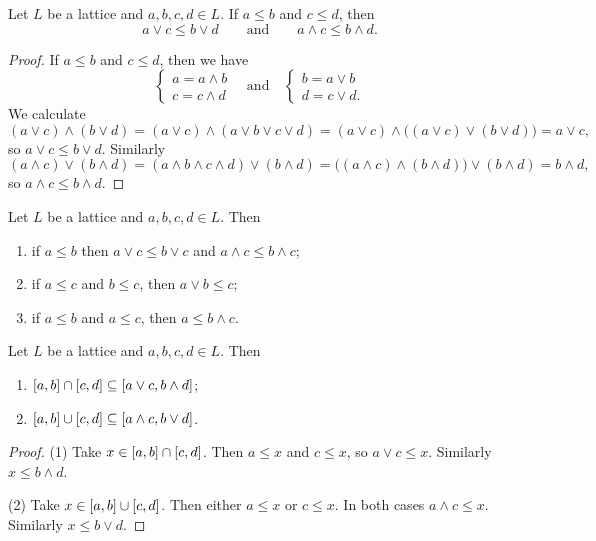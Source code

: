 \begin{lemma} \label{orderLatticeLemma}
Let $L$ be a lattice and $a,b,c,d\in L$. If $a\leq b$ and $c\leq d$, then
\[ a\vee c\leq b\vee d \qquad\text{and}\qquad a\wedge c \leq b\wedge d. \]
\end{lemma}
\begin{proof}
If $a\leq b$ and $c\leq d$, then we have
\[ \begin{cases}
a = a\wedge b \\ c = c\wedge d
\end{cases} \quad \text{and} \quad \begin{cases}
b = a\vee b \\ d = c\vee d.
\end{cases}\]
We calculate
\[ (a\vee c)\wedge (b\vee d) = (a\vee c)\wedge (a\vee b\vee c\vee d) = (a\vee c)\wedge \big((a\vee c)\vee (b\vee d)\big) = a\vee c, \]
so $a\vee c\leq b\vee d$.
Similarly
\[ (a\wedge c)\vee (b\wedge d) = (a\wedge b\wedge c\wedge d)\vee (b\wedge d) = \big((a\wedge c)\wedge (b\wedge d)\big)\vee (b\wedge d) = b\wedge d, \]
so $a\wedge c \leq b\wedge d$.
\end{proof}
\begin{corollary} \label{orderLatticeCorollary}
Let $L$ be a lattice and $a,b,c,d\in L$. Then
\begin{enumerate}
\item if $a\leq b$ then $a\vee c \leq b \vee c$ and $a\wedge c \leq b\wedge c$;
\item if $a\leq c$ and $b\leq c$, then $a\vee b \leq c$;
\item if $a\leq b$ and $a\leq c$, then $a\leq b\wedge c$.
\end{enumerate}
\end{corollary}
\begin{corollary} \label{unionIntersectionIntervals}
Let $L$ be a lattice and $a,b,c,d\in L$. Then
\begin{enumerate}
\item $\interval{a, b} \cap \interval{c,d} \subseteq \interval{a\vee c, b\wedge d}$;
\item $\interval{a, b} \cup \interval{c,d} \subseteq \interval{a\wedge c, b\vee d}$.
\end{enumerate}
\end{corollary}
\begin{proof}
(1) Take $x\in \interval{a, b} \cap \interval{c,d}$. Then $a\leq x$ and $c \leq x$, so $a\vee c \leq x$. Similarly $x \leq b\wedge d$.

(2) Take $x\in \interval{a, b} \cup \interval{c,d}$. Then either $a \leq x$ or $c \leq x$. In both cases $a\wedge c \leq x$. Similarly $x  \leq b \vee d$.
\end{proof}
